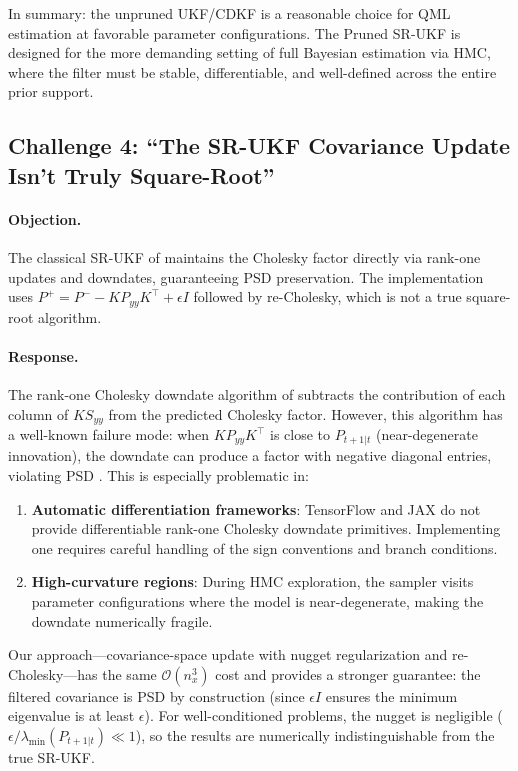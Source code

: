 \documentclass[12pt,a4paper]{article}
\newcommand{\cO}{\mathcal{O}}
\begin{document}
In summary: the unpruned UKF/CDKF is a reasonable choice for QML
estimation at favorable parameter configurations. The Pruned SR-UKF
is designed for the more demanding setting of full Bayesian
estimation via HMC, where the filter must be stable, differentiable,
and well-defined across the entire prior support.

\subsection{Challenge 4: ``The SR-UKF Covariance Update Isn't Truly Square-Root''}
\label{sec:challenge-sr}

\paragraph{Objection.}
The classical SR-UKF of \citet{van2001square} maintains the Cholesky
factor directly via rank-one updates and downdates, guaranteeing
PSD preservation. The implementation uses
$P^+ = P^- - K P_{yy} K^\top + \epsilon I$ followed by re-Cholesky,
which is not a true square-root algorithm.

\paragraph{Response.}
The rank-one Cholesky downdate algorithm of \citet{van2001square}
subtracts the contribution of each column of $K S_{yy}$ from the
predicted Cholesky factor. However, this algorithm has a well-known
failure mode: when $K P_{yy} K^\top$ is close to $P_{t+1|t}$
(near-degenerate innovation), the downdate can produce a factor with
negative diagonal entries, violating PSD \citep{seeger2004low}. This
is especially problematic in:
\begin{enumerate}[nosep]
\item \textbf{Automatic differentiation frameworks}: TensorFlow and
JAX do not provide differentiable rank-one Cholesky downdate
primitives. Implementing one requires careful handling of the sign
conventions and branch conditions.
\item \textbf{High-curvature regions}: During HMC exploration, the
sampler visits parameter configurations where the model is
near-degenerate, making the downdate numerically fragile.
\end{enumerate}

Our approach---covariance-space update with nugget regularization
and re-Cholesky---has the same $\cO(n_x^3)$ cost and provides a
stronger guarantee: the filtered covariance is PSD by construction
(since $\epsilon I$ ensures the minimum eigenvalue is at least
$\epsilon$). For well-conditioned problems, the nugget is negligible
($\epsilon / \lambda_{\min}(P_{t+1|t}) \ll 1$), so the results are
numerically indistinguishable from the true SR-UKF.
\end{document}
